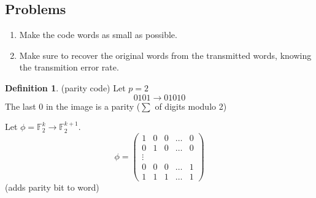 \documentclass[12pt]{article}
\theoremstyle{definition}
\newtheorem{definition}{Definition}[section]
\theoremstyle{remark}
\begin{document}
\subsection{Problems}
\begin{enumerate}
    \item Make the code words as small as possible.
    \item Make sure to recover the original words from the transmitted words, knowing the transmition error rate. 
\end{enumerate}
\begin{definition}(parity code)
    Let $p=2$
    $$0101 \rightarrow 01010 $$
    The last 0 in the image is a parity ($\sum$ of digits modulo 2)
    
\end{definition}
\begin{example}
    Let $\phi =\mathbb{F}^k_2\rightarrow \mathbb{F}^{k+1}_2$. 
    $$\phi = \begin{pmatrix}
        1&0&0 &\hdots &0 \\0&1&0 &\hdots &0 \\ \vdots \\ 0&0&0 &\hdots &1 \\ 1&1&1&\hdots &1
    \end{pmatrix}$$
    (adds parity bit to word)
\end{example}
\end{document}
